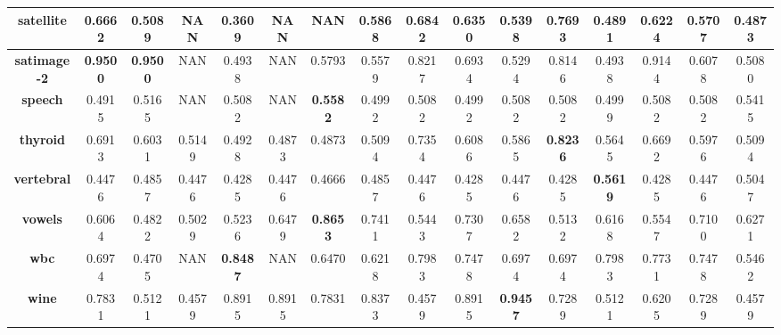 \begin{table}
{\begin{tabular}{|c|c|c|c|c|c|c|c|c|c|c|c|c|c|c|c|}
	\textbf{satellite}          & 0.6662          & 0.5089          & NAN             & 0.3609          & NAN           & NAN             & 0.5868          & 0.6842          & 0.6350       & 0.5398          & \textbf{0.7693} & 0.4891          & 0.6224          & 0.5707          & 0.4873       \\ \hline
	\textbf{satimage-2}         & \textbf{0.9500} & \textbf{0.9500} & NAN             & 0.4938          & NAN           & 0.5793          & 0.5579          & 0.8217          & 0.6934       & 0.5294          & 0.8146          & 0.4938          & 0.9144          & 0.6078          & 0.5080       \\ \hline
	\textbf{speech}             & 0.4915          & 0.5165          & NAN             & 0.5082          & NAN           & \textbf{0.5582} & 0.4992          & 0.5082          & 0.4992       & 0.5082          & 0.5082          & 0.4999          & 0.5082          & 0.5082          & 0.5415       \\ \hline
	\textbf{thyroid}            & 0.6913          & 0.6031          & 0.5149          & 0.4928          & 0.4873        & 0.4873          & 0.5094          & 0.7354          & 0.6086       & 0.5865          & \textbf{0.8236} & 0.5645          & 0.6692          & 0.5976          & 0.5094       \\ \hline
	\textbf{vertebral}          & 0.4476          & 0.4857          & 0.4476          & 0.4285          & 0.4476        & 0.4666          & 0.4857          & 0.4476          & 0.4285       & 0.4476          & 0.4285          & \textbf{0.5619} & 0.4285          & 0.4476          & 0.5047       \\ \hline
	\textbf{vowels}             & 0.6064          & 0.4822          & 0.5029          & 0.5236          & 0.6479        & \textbf{0.8653} & 0.7411          & 0.5443          & 0.7307       & 0.6582          & 0.5132          & 0.6168          & 0.5547          & 0.7100          & 0.6271       \\ \hline
	\textbf{wbc}                & 0.6974          & 0.4705          & NAN             & \textbf{0.8487} & NAN           & 0.6470          & 0.6218          & 0.7983          & 0.7478       & 0.6974          & 0.6974          & 0.7983          & 0.7731          & 0.7478          & 0.5462       \\ \hline
	\textbf{wine}               & 0.7831          & 0.5121          & 0.4579          & 0.8915          & 0.8915        & 0.7831          & 0.8373          & 0.4579          & 0.8915       & \textbf{0.9457} & 0.7289          & 0.5121          & 0.6205          & 0.7289          & 0.4579       \\ \hline
\end{tabular}
}
\end{table}

